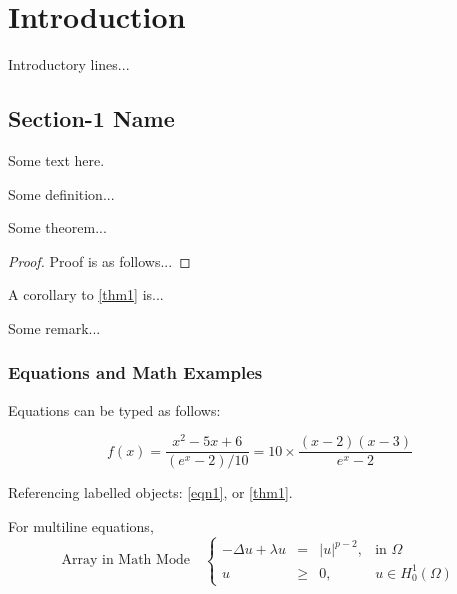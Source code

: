 \chapter{Introduction}

Introductory lines...

\section{Section-1 Name}

Some text here.

\begin{definition}
Some definition...
\end{definition}

\begin{theorem}\label{thm1}
Some theorem...
\end{theorem}

\begin{proof}
Proof is as follows...
\end{proof}

\begin{corollary}
A corollary to \autoref{thm1} is...
\end{corollary}

\begin{remark}
Some remark...
\end{remark}

\subsection{Equations and Math Examples}

Equations can be typed as follows:

\begin{equation}\label{eqn1}
f(x) = \frac{x^2 - 5x + 6}{(e^x - 2)/10} = 10 \times \frac{(x-2)(x-3)}{e^x-2}
\end{equation}

Referencing labelled objects: \autoref{eqn1}, or \autoref{thm1}.  

For multiline equations,
\begin{equation}\label{eqn2}
\text{Array in Math Mode} \quad
\left\{
\begin{array}{rcll}
-\Delta u + \lambda u &=& |u|^{p-2}, & \text{in } \Omega\\
u &\geq& 0, & u \in H_0^1(\Omega)
\end{array}
\right.
\end{equation}

